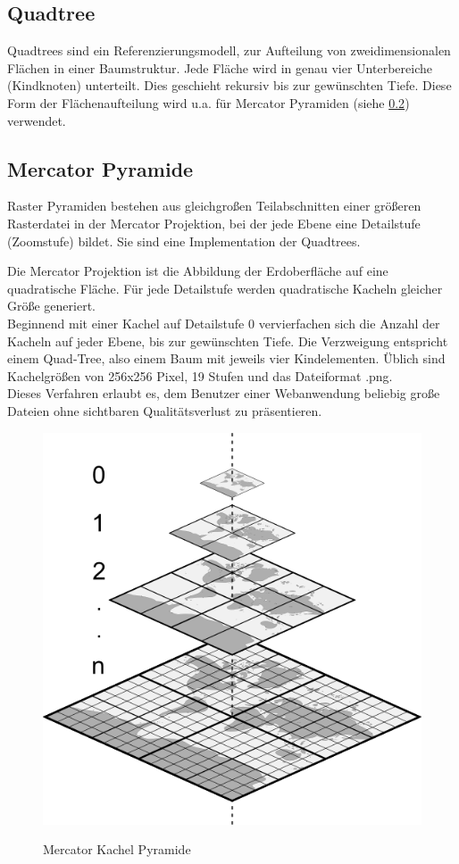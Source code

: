 \documentclass[10pt,conference,compsocconf]{IEEEtran}
\begin{document}
\subsection{Quadtree}
Quadtrees\cite{QuadTrees} sind ein Referenzierungsmodell, zur Aufteilung von zweidimensionalen Flächen in einer Baumstruktur. Jede Fläche wird in genau vier Unterbereiche (Kindknoten) unterteilt. Dies geschieht rekursiv bis zur gewünschten Tiefe. Diese Form der Flächenaufteilung wird u.a. für Mercator Pyramiden (siehe \ref{sub:MercatorPyramide}) verwendet.


\subsection{Mercator Pyramide}
\label{sub:MercatorPyramide}
Raster Pyramiden bestehen aus gleichgroßen Teilabschnitten einer größeren Rasterdatei in der Mercator Projektion, bei der jede Ebene eine Detailstufe (Zoomstufe) bildet. Sie sind eine Implementation der Quadtrees. \par
Die Mercator Projektion ist die Abbildung der Erdoberfläche auf eine quadratische Fläche. Für jede Detailstufe werden quadratische Kacheln gleicher Größe generiert. \\
Beginnend mit einer Kachel auf Detailstufe 0 vervierfachen sich die Anzahl der Kacheln auf jeder Ebene, bis zur gewünschten Tiefe. Die Verzweigung entspricht einem Quad-Tree, also einem Baum mit jeweils vier Kindelementen. Üblich sind Kachelgrößen von 256x256 Pixel, 19 Stufen und das Dateiformat .png. \\
Dieses Verfahren erlaubt es, dem Benutzer einer Webanwendung beliebig große Dateien ohne sichtbaren Qualitätsverlust zu präsentieren.\\
\begin{figure}[H]
	\centering
	\includegraphics[width=0.6\columnwidth]{img/mercator_pyramid.png}\\
	\caption[]{Mercator Kachel Pyramide}
	\label{img:mercator_pyramid}
\end{figure}
\end{document}
